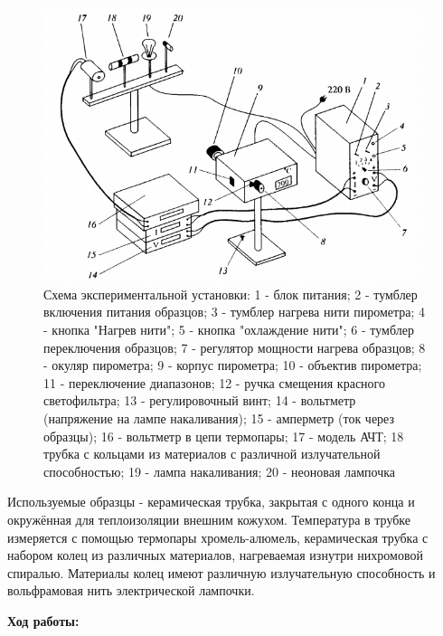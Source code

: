 \documentclass[a4paper, 12pt]{article}%
\begin{document}
	\begin{figure}[h]
		\centering
		\includegraphics[width=11cm]{fig1.PNG}
		\caption{Схема экспериментальной установки: 1 - блок питания; 2 - тумблер включения питания образцов; 3 - тумблер нагрева нити пирометра; 4 - кнопка "Нагрев нити"; 5 - кнопка "охлаждение нити"; 6 - тумблер переключения образцов; 7 - регулятор мощности нагрева образцов; 8 - окуляр пирометра; 9 - корпус пирометра; 10 - объектив пирометра; 11 - переключение диапазонов; 12 - ручка смещения красного светофильтра; 13 - регулировочный винт; 14 - вольтметр (напряжение на лампе накаливания); 15 - амперметр (ток через образцы); 16 - вольтметр в цепи термопары; 17 - модель АЧТ; 18 трубка с кольцами из материалов с различной излучательной способностью; 19 - лампа накаливания; 20 - неоновая лампочка}
		\label{fig:vac}
	\end{figure}
	
		Используемые образцы - керамическая трубка, закрытая с одного конца и окружённая для теплоизоляции внешним кожухом. Температура в трубке измеряется с помощью термопары хромель-алюмель, керамическая трубка с набором колец из различных материалов, нагреваемая изнутри нихромовой спиралью. Материалы колец имеют различную излучательную способность и вольфрамовая нить электрической лампочки.\\
	
	\newpage
	
	\textbf{Ход работы: }\\
	
\end{document}
